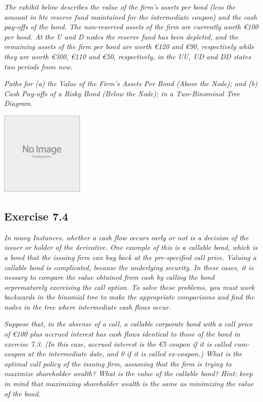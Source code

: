 \documentclass[]{book}
\newcommand{\euro}{€}
\theoremstyle{definition}
\theoremstyle{definition}
\theoremstyle{remark}
\begin{document}
\emph{The exhibit below describes the value of the firm's assets per
bond (less the amount in hte reserve fund maintained for the
intermediate coupon) and the cash pay-offs of the bond. The non-reserved
assets of the firm are currently worth \euro{}100 per bond. At the U and
D nodes the reserve fund has been depleted, and the remaining assets of
the firm per bond are worth \euro{}120 and \euro{}90, respectively while
they are worth \euro{}300, \euro{}110 and \euro{}50, respectively, in
the UU, UD and DD states two periods from now.} \citep[p.234]{book}

\emph{Paths for (a) the Value of the Firm's Assets Per Bond (Above the
Node); and (b) Cash Pay-offs of a Risky Bond (Below the Node); in a
Two-Binominal Tree Diagram.} \citep[p.234]{book}

\begin{center}\includegraphics[width=150px]{figures/placeholder} \end{center}

\subsection{Exercise 7.4}\label{exercise-7.4}

\emph{In many Instances, whether a cash flow occurs early or not is a
decision of the issuer or holder of the derivative. One example of this
is a callable bond, which is a bond that the issuing firm can buy back
at the pre-specified call price. Valuing a callable bond is complicated,
because the underlying security. In these cases, it is nessary to
compare the value obtained from cash by calling the bond orprematurely
exercising the call option. To solve these problems, you must work
backwards in the binomial tree to make the appropriate comparisons and
find the nodes in the tree where intermediate cash flows occur.}
\citep[p.235]{book}

\emph{Suppose that, in the absense of a call, a callable corporate bond
with a call price of \euro{}100 plus accrued interest has cash flows
identical to those of the bond in exercise 7.3. (In this case, accrued
interest is the \euro{}5 coupon if it is called cum-coupon at the
intermediate date, and 0 if it is called ex-coupon.) What is the optimal
call policy of the issuing firm, assuming that the firm is trying to
maximize shareholder wealth? What is the value of the callable bond?
Hint: keep in mind that maximizing shareholder wealth is the same as
minimizing the value of the bond.} \citep[p.235]{book}
\end{document}

